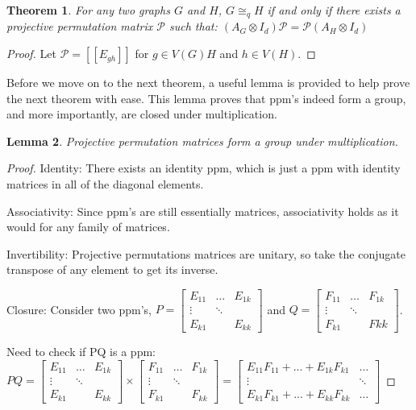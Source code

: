 \documentclass[12pt]{article}
\newtheorem{thm}{Theorem}[section]
\newtheorem{lem}[thm]{Lemma}
\begin{document}
\begin{thm}
For any two graphs $G$ and $H$, $G \cong_q H$ if and only if there exists a projective permutation matrix $\mathcal{P}$ such that: $(A_G \otimes I_d)\mathcal{P} = \mathcal{P} (A_H \otimes I_d)$
\end{thm}
\begin{proof}
Let $\mathcal{P} = [[E_{gh}]]$ for $g \in V(G)H$ and $h \in V(H)$.
\end{proof}

Before we move on to the next theorem, a useful lemma is provided to help prove the next theorem with ease. This lemma proves that ppm's indeed form a group, and more importantly, are closed under multiplication.

\begin{lem}
Projective permutation matrices form a group under multiplication.
\end{lem}
\begin{proof}
Identity: There exists an identity ppm, which is just a ppm with identity matrices in all of the diagonal elements.

Associativity: Since ppm's are still essentially matrices, associativity holds as it would for any family of matrices.

Invertibility: Projective permutations matrices are unitary, so take the conjugate transpose of any element to get its inverse.

Closure: Consider two ppm's, $P = \begin{bmatrix}
E_{11} & \dots & E_{1k} \\
\vdots  & \ddots \\
E_{k1} &        & E_{kk}
\end{bmatrix}$ and $Q = \begin{bmatrix}
F_{11} & \dots & F_{1k} \\
\vdots  & \ddots \\
F_{k1} &        & F{kk}
\end{bmatrix}$. 

Need to check if PQ is a ppm:
$PQ = \begin{bmatrix}
E_{11} & \dots & E_{1k} \\
\vdots  & \ddots \\
E_{k1} &        & E_{kk}
\end{bmatrix}
\times
\begin{bmatrix}
F_{11} & \dots & F_{1k} \\
\vdots  & \ddots \\
F_{k1} &        & F_{kk}
\end{bmatrix}
= 
\begin{bmatrix}
E_{11}F_{11} + ... + E_{1k}F_{k1} & \dots  \\
\vdots  & \ddots \\
E_{k1}F_{k1} + ... + E_{kk}F_{kk} & \dots
\end{bmatrix}
$
\end{proof}
\end{document}
